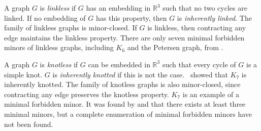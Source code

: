 A graph $G$ is \textit{linkless} if $G$ has an embedding in $\mathbb{R}^3$ such that no two cycles are linked. If no embedding of $G$ has this property, then $G$ is \textit{inherently linked}. The family of linkless graphs is minor-closed. If $G$ is linkless, then contracting any edge maintains the linkless property. There are only seven minimal forbidden minors of linkless graphs, including $K_6$ and the Petersen graph, from \textcite{robertsonSachsLinklessEmbedding1995}. 

A graph $G$ is \textit{knotless} if $G$ can be embedded in $\mathbb{R}^3$ such that every cycle of $G$ is a simple knot. $G$ is \textit{inherently knotted} if this is not the case.\ \textcite{conwayKnotsLinksSpatial1983} showed that $K_7$ is inherently knotted. The family of knotless graphs is also minor-closed, since contracting any edge preserves the knotless property. $K_7$ is an example of a minimal forbidden minor. It was found by \textcite{conwayKnotsLinksSpatial1983} and \textcite{foisyIntrinsicallyKnottedGraphs2002,foisyNewlyRecognizedIntrinsically2003} that there exists at least three minimal minors, but a complete enumeration of minimal forbidden minors have not been found. 
